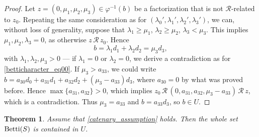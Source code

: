 \documentclass[12pt]{article}
\newtheorem{thm}{Theorem}[section]
\theoremstyle{remark}
\begin{document}
\begin{proof}
    Let $z=(0,\mu_1, \mu_2,  \mu_3) \in \varphi^{-1}(b)$ be a factorization that is not $\mathcal{R}$-related to $z_0$. Repeating the same consideration as for $(\lambda_0',\lambda_1',\lambda_2', \lambda_3')$, we can, without loss of generality, suppose that $\lambda_1 \geq \mu_1$, $\lambda_2 \geq \mu_2$, $\lambda_3 < \mu_3$. This implies $\mu_1, \mu_2, \lambda_3 =0$, as otherwise $z \, \mathcal{R} \, z_0$. Hence
    \begin{equation}\label{betticharacter_eq03}
       b= \lambda_1d_1 + \lambda_2d_2   =  \mu_3d_3,
    \end{equation}
    with $\lambda_1, \lambda_2, \mu_3> 0$ --- if $\lambda_1 =0$ or $\lambda_2 = 0$, we derive a contradiction as for \eqref{betticharacter_eq00}.
    If $ \mu_3 > a_{33}$, we could write $b  =  a_{30}d_0 + a_{31}d_1 + a_{32}d_2 +  (\mu_3-a_{33})d_3$, where $a_{30} = 0$ by what was proved before. Hence $\max \{a_{31},a_{32}\} > 0$, which implies $z_0 \, \mathcal{R} \, (0,a_{31},a_{32},\mu_3-a_{33}) \, \mathcal{R} \,z$, which is a contradiction. Thus $\mu_3 = a_{33}$ and $b = a_{33}d_3$, so $b \in U
    $.
\end{proof}




\begin{thm}\label{theorembettifind}
Assume that \eqref{catenary_assumption} holds. Then the whole set $\textup{Betti}(S)$ is contained in $U$. 
\end{thm}
\end{document}
